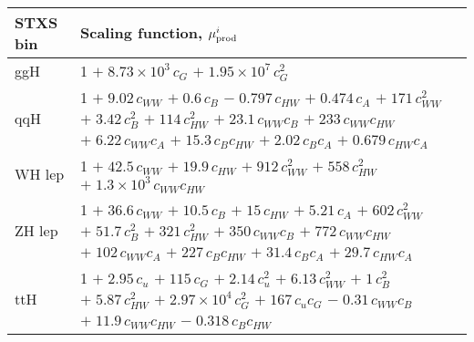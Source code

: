 \begin{tabular}{l|p{}}
    \hline
    STXS bin & Scaling function, $\mu^i_{\rm{prod}}$ \\ \hline
    ggH & 1 $+\;8.73\times 10^{3}\,c_{G}$ $+\;1.95\times 10^{7}\,c_{G}^{2}$ \\
    qqH & 1 $+\;9.02\,c_{WW}$ $+\;0.6\,c_{B}$ $-\;0.797\,c_{HW}$ $+\;0.474\,c_{A}$ $+\;171\,c_{WW}^{2}$ $+\;3.42\,c_{B}^{2}$ $+\;114\,c_{HW}^{2}$ $+\;23.1\,c_{WW}c_{B}$ $+\;233\,c_{WW}c_{HW}$ $+\;6.22\,c_{WW}c_{A}$ $+\;15.3\,c_{B}c_{HW}$ $+\;2.02\,c_{B}c_{A}$ $+\;0.679\,c_{HW}c_{A}$ \\
    WH lep & 1 $+\;42.5\,c_{WW}$ $+\;19.9\,c_{HW}$ $+\;912\,c_{WW}^{2}$ $+\;558\,c_{HW}^{2}$ $+\;1.3\times 10^{3}\,c_{WW}c_{HW}$ \\
    ZH lep & 1 $+\;36.6\,c_{WW}$ $+\;10.5\,c_{B}$ $+\;15\,c_{HW}$ $+\;5.21\,c_{A}$ $+\;602\,c_{WW}^{2}$ $+\;51.7\,c_{B}^{2}$ $+\;321\,c_{HW}^{2}$ $+\;350\,c_{WW}c_{B}$ $+\;772\,c_{WW}c_{HW}$ $+\;102\,c_{WW}c_{A}$ $+\;227\,c_{B}c_{HW}$ $+\;31.4\,c_{B}c_{A}$ $+\;29.7\,c_{HW}c_{A}$ \\
    ttH & 1 $+\;2.95\,c_{u}$ $+\;115\,c_{G}$ $+\;2.14\,c_{u}^{2}$ $+\;6.13\,c_{WW}^{2}$ $+\;1\,c_{B}^{2}$ $+\;5.87\,c_{HW}^{2}$ $+\;2.97\times 10^{4}\,c_{G}^{2}$ $+\;167\,c_{u}c_{G}$ $-\;0.31\,c_{WW}c_{B}$ $+\;11.9\,c_{WW}c_{HW}$ $-\;0.318\,c_{B}c_{HW}$ \\
    \hline
\end{tabular}
